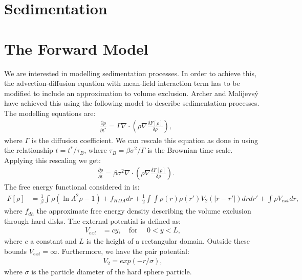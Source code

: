 \documentclass[11pt, a4paper]{article}
\theoremstyle{definition}
\begin{document}
\section*{Sedimentation}
\section{The Forward Model}
We are interested in modelling sedimentation processes. In order to achieve this, the advection-diffusion equation with mean-field interaction term has to be modified to include an approximation to volume exclusion. Archer and Malijevs\'y \cite{ArcherSed1} have achieved this using the following model to describe sedimentation processes. 
The modelling equations are:
\begin{align*}
	&\frac{\partial \rho}{\partial t^*} = \Gamma\nabla \cdot \left(  \rho \nabla \frac{\delta F[\rho]}{\delta \rho} \right) ,
\end{align*}
where $\Gamma$ is the diffusion coefficient. 	
We can rescale this equation as done in \cite{ArcherSed1} using the relationship $t = t^*/ \tau_B$, where $\tau_B = \beta \sigma^2 / \Gamma$ is the Brownian time scale.
Applying this rescaling we get:
\begin{align}\label{Eq1}
	&\frac{\partial \rho}{\partial t} = \beta \sigma^2\nabla \cdot \left(  \rho \nabla \frac{\delta F[\rho]}{\delta \rho} \right).
\end{align}
The free energy functional considered in \cite{ArcherSed1} is:
\begin{align*}
	F[\rho] &= \frac{1}{\beta} \int \rho (\ln \Lambda^2 \rho - 1) + f_{HDA} dr + \frac{1}{2}\int \int \rho(r) \rho(r') V_2(|r - r'|) dr dr' + \int \rho V_{ext} dr,
\end{align*}
where $f_{dh}$ the approximate free energy density describing the volume exclusion through hard disks. The external potential is defined as:
\begin{align*}
	V_{ext} &= c y, \quad \text{for } \quad 0 < y < L,
\end{align*}
where $c$ a constant and $L$ is the height of a rectangular domain. Outside these bounds $V_{ext} = \infty$. 
Furthermore, we have the pair potential:
\begin{align*}
	V_2 = exp(-r/\sigma),
\end{align*}
where $\sigma$ is the particle diameter of the hard sphere particle.
\end{document}
